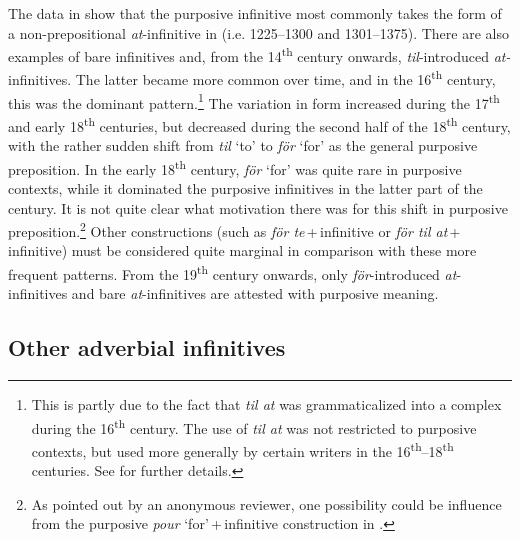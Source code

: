 \documentclass[output=paper]{langscibook}
\begin{document}
The data in  show that the purposive infinitive most commonly takes the form of a non-prepositional \textit{at}{}-infinitive in  (i.e. 1225–1300 and 1301–1375). There are also examples of bare infinitives and, from the 14\textsuperscript{th} century onwards, \textit{til}{}-introduced \textit{at-}infinitives. The latter became more common over time, and in the 16\textsuperscript{th} century, this was the dominant pattern.\footnote{This is partly due to the fact that \textit{til at} was grammaticalized into a complex  during the 16\textsuperscript{th} century. The use of \textit{til at} was not restricted to purposive contexts, but used more generally by certain writers in the 16\textsuperscript{th}–18\textsuperscript{th} centuries. See \textcites[]{Kalm2016Prepositioner}[203–221]{Kalm2016Satsekvivalenta} for further details.} The variation in form increased during the 17\textsuperscript{th} and early 18\textsuperscript{th} centuries, but decreased during the second half of the 18\textsuperscript{th} century, with the rather sudden shift from \textit{til} ‘to’ to \textit{för} ‘for’ as the general purposive preposition. In the early 18\textsuperscript{th} century, \textit{för} ‘for’ was quite rare in purposive contexts, while it dominated the purposive infinitives in the latter part of the century. It is not quite clear what motivation there was for this shift in purposive preposition.\footnote{As pointed out by an anonymous reviewer, one possibility could be influence from the purposive \textit{pour} ‘for’\,+\,infinitive construction in .}  Other constructions (such as \textit{för te}\,+\,infinitive or \textit{för til at}\,+\,infinitive) must be considered quite marginal in comparison with these more frequent patterns. From the 19\textsuperscript{th} century onwards, only \textit{för}{}-introduced \textit{at}{}-infinitives and bare \textit{at}{}-infinitives are attested with purposive meaning. 


\subsection{Other adverbial infinitives}\label{sec:kalm:4.2}
\end{document}
